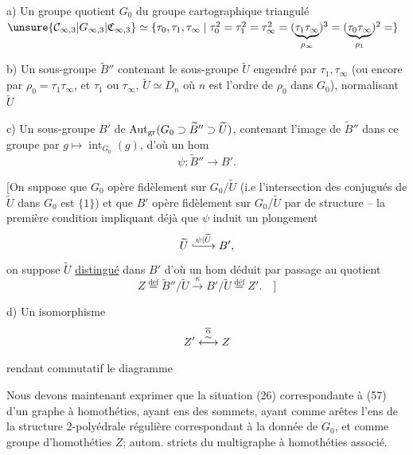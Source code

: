 \noindent{}a) Un groupe quotient $G_0$ du groupe cartographique triangulé $\unsure{\mathcal C_{\infty,3}|G_{\infty,3}|\mathfrak C_{\infty,3}}\simeq\{\tau_0,\tau_1,\tau_\infty\mid\tau_0^2=\tau_1^2=\tau_\infty^{2}=(\underbrace{\tau_1\tau_\infty}_{\rho_\infty})^3=(\underbrace{\tau_0\tau_\infty}_{\rho_1})^2=\}$

b) Un sous-groupe $\widetilde B''$   contenant le sous-groupe $\widetilde U$ engendré par $\tau_1,\tau_\infty$ (ou encore par $\rho_0=\tau_1\tau_\infty$, et $\tau_1$ ou $\tau_\infty$, $\widetilde U\simeq D_n$  où $n$ est l'ordre de $\rho_0$ dans $G_0$), normalisant $\widetilde U$

c) Un sous-groupe $B'$ de $\operatorname{Aut}_{\rm gr}(G_0\supset\widetilde B''\supset\widetilde U)$,  contenant l'image de $\widetilde B''$ dans ce groupe par $g\mapsto\operatorname{int}_{G_0}(g)$, d'où un hom
\[
\psi:\widetilde B''\longrightarrow B'.
\]

[On suppose que $G_0$ opère fidèlement sur $G_0/\widetilde U$ (i.e l'intersection des conjugués de $\widetilde U$ dans $G_0$ est $\{1\}$) et que $B'$ opère fidèlement sur $G_0/\widetilde U$ par  de structure -- la première condition impliquant déjà que $\psi$ induit un plongement
\[
\widetilde U\lhook\joinrel\xrightarrow{\psi\mid\widetilde U} B',
\]
on suppose $\widetilde U$ \uline{distingué} dans $B'$  d'où un hom déduit par passage au quotient
\[
Z\overset{\mathrm{def}}{=}\widetilde B''/\widetilde U\xrightarrow{\kappa}B'/\widetilde U\overset{\mathrm{déf}}{=}Z'.\quad\biggr]
\]

d) Un isomorphisme
\[
Z'\overset{\overline{\alpha}}{\underset{\vphantom{a}}{\overset{\sim}{\longleftrightarrow}}}Z
\]
rendant commutatif le diagramme

Nous devons maintenant exprimer que  la situation (26) correspondante à (57)   d'un graphe à homothéties,  ayant    ens des sommets, ayant comme  arêtes l'ens  de la structure 2-polyédrale régulière correspondant à la donnée de $G_0$, et comme groupe d'homothéties $Z$;   autom. stricts du multigraphe à homothéties associé.


